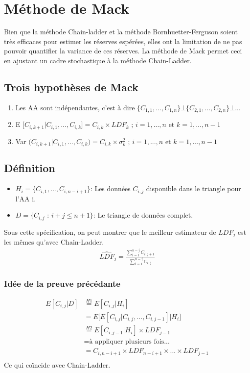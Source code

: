 \documentclass[11pt,french]{report}
\begin{document}
\section{Méthode de Mack}
Bien que la méthode Chain-ladder et la méthode Bornhuetter-Ferguson soient très efficaces pour estimer les réserves espérées, elles ont la limitation de ne pas pouvoir quantifier la variance de ces réserves. La méthode de Mack permet ceci en ajustant un cadre stochastique à la méthode Chain-Ladder.

\subsection*{Trois hypothèses de Mack}
\begin{enumerate}
\item Les AA sont indépendantes, c'est à dire $\lbrace C_{1,1}, ..., C_{1,n} \rbrace \bot \lbrace C_{2,1}, ..., C_{2,n}\rbrace \bot ... $
\item E $\Big[ C_{i, k+1} | C_{i,1}, ..., C_{i,k}\Big] = C_{i,k} \times LDF_k \text{ ; }i = 1, ..., n \text{ et } k = 1, ..., n-1$ 
\item Var $\Big( C_{i, k+1} | C_{i,1}, ..., C_{i,k}\Big) = C_{i,k} \times \sigma_k^2 \text{ ; }i = 1, ..., n \text{ et } k = 1, ..., n-1$ 
\end{enumerate}

\subsection*{Définition}
\begin{itemize}
\item $H_i = \lbrace C_{i,1}, ..., C_{i,n-i+1} \rbrace$: Les données $C_{i,j}$ disponible dans le triangle pour l'AA i.
\item $D = \lbrace C_{i,j} \text{ : } i+j \leq n + 1 \rbrace$: Le triangle de données complet.
\end{itemize}
Sous cette spécification, on peut montrer que le meilleur estimateur de $LDF_j$ est les mêmes qu'avec Chain-Ladder.
\begin{align*}
\widehat{LDF}_j = \frac{\sum_{i = 1}^{n-j}C_{i,j+1}}{\sum_{i = 1}^{n-j}C_{i,j}}
\end{align*}
\subsubsection*{Idée de la preuve précédante}
\begin{align*}
E[C_{i,j} | D] &\overset{H1}{=} E[C_{i,j}|H_i] \\
&= E\Big[ E[C_{i,j}|C_{i,j},...,C_{i,j-1}] \big| H_i \Big] \\
&\overset{H2}{=} E[C_{i,j-1}|H_i] \times LDF_{j-1} \\
&= \text{à appliquer plusieurs fois...} \\
&=C_{i,n-i+1} \times LDF_{n-i+1} \times ... \times LDF_{j-1} \\
\end{align*}
Ce qui coïncide avec Chain-Ladder.
\end{document}
